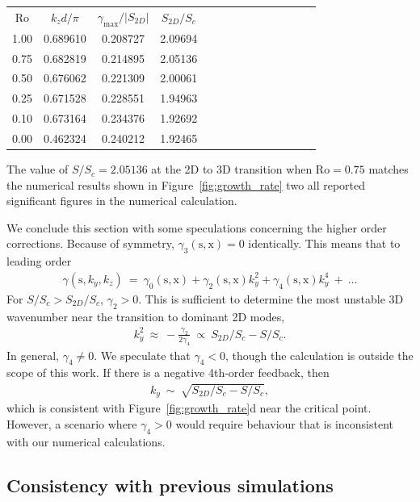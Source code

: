 \documentclass[openacc]{rsproca_new}%
\newcommand{\SSC}{S/S_{c}}
\newcommand\Beq{\begin{eqnarray}}
\newcommand\Eeq{\end{eqnarray}}
\newcommand{\Ro}{\mathrm{Ro}}
\newcommand{\s}{\text{s}}
\newcommand{\x}{\text{x}}
\begin{document}
\begin{center}
\begin{tabular}{cccccccccccccc}
\textbf{$\Ro$} & \textbf{$k_{z} d/\pi$}  & \textbf{$\gamma_{\max}/|S_{2D}|$}  &  \textbf{$S_{2D}/S_{c}$} \\
                   1.00  & 0.689610 & 0.208727 &   2.09694 \\ 
                   0.75 & 0.682819 & 0.214895 & 2.05136 \\
                   0.50 & 0.676062 & 0.221309 & 2.00061 \\
                   0.25 & 0.671528 & 0.228551 & 1.94963 \\
                   0.10 & 0.673164 & 0.234376 & 1.92692 \\
                   0.00 & 0.462324 & 0.240212 & 1.92465
\end{tabular}
\end{center}
The value of $\SSC = 2.05136$ at the 2D to 3D transition when $\Ro = 0.75$ matches the numerical results shown in Figure~\ref{fig:growth_rate} two all reported significant figures in the numerical calculation. 

We conclude this section with some speculations concerning the higher order corrections. Because of symmetry, $\gamma_{3}(\s,\x) = 0$ identically. This means that to leading order 
\Beq
\gamma(\s,k_{y},k_{z}) \ = \ \gamma_{0}(\s,\x) + \gamma_{2}(\s,\x) k_{y}^{2}  + \gamma_{4}(\s,\x) k_{y}^{4} \ + \ \ldots
\Eeq 
For $\SSC > S_{2D}/S_{c}$, $\gamma_{2} > 0$. This is sufficient to determine the most unstable 3D wavenumber near the transition to dominant 2D modes, 
\Beq
k_{y}^{2} \ \approx \ -\frac{\gamma _2}{2 \gamma_4} \  \propto \   S_{2D}/S_{c} - \SSC   . 
\Eeq 
In general, $\gamma_{4} \ne 0$. We speculate that $\gamma_{4} < 0$, though the calculation is outside the scope of this work. If there is a negative 4th-order feedback, then 
\Beq
k_{y} \ \sim \ \sqrt{S_{2D}/S_{c} - \SSC}, 
\Eeq
which is consistent with Figure~\ref{fig:growth_rate}d near the critical point. However, a scenario where $\gamma_{4} > 0$ would require behaviour that is inconsistent with our numerical calculations.

\subsection{Consistency with previous simulations}
\label{sec:prior_work}
\end{document}
